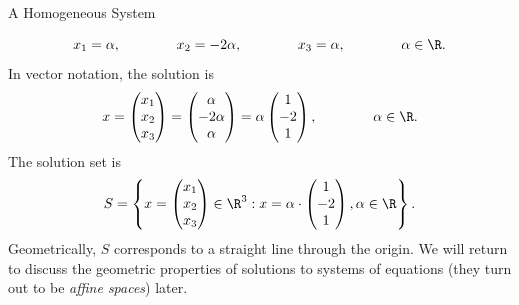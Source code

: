\documentclass[smaller,hyperref={CJKbookmarks=true}]{beamer}
\begin{document}
\begin{frame}{A Homogeneous System}
\begin{spacing}{1.0}
\[x_1=\alpha,\qquad\qquad x_2=-2\alpha,\qquad\qquad
x_3=\alpha,\qquad\qquad
\alpha\in\R.\] \newpage
In vector notation, the solution is
\[x=\begin{pmatrix}x_1 \\x_2 \\x_3
\end{pmatrix}=\begin{pmatrix}
\alpha \\-2\alpha \\ \alpha
\end{pmatrix}=\alpha\begin{pmatrix}
1 \\ -2 \\1 \end{pmatrix},\qquad\qquad\alpha\in\R.\]
The solution set is
\[S=\left\{x=\begin{pmatrix}
x_1 \\x_2 \\x_3\end{pmatrix}\in\R^3:x=\alpha\cdot\begin{pmatrix}
1 \\-2 \\1\end{pmatrix},\alpha\in\R\right\}.\]
Geometrically, $S$ corresponds to a straight line through the origin. We will return to discuss the geometric properties of solutions to systems of
equations (they turn out to be \emph{af{}fine spaces}) later.
\end{spacing}
\end{frame}
\end{document}
